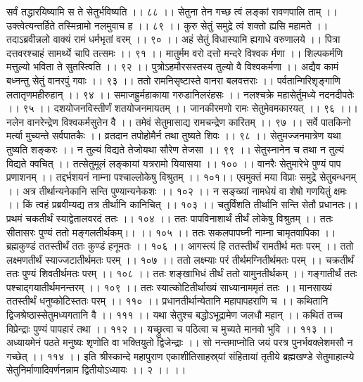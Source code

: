 सर्वं तद्धारयिष्यामि स ते सेतुर्भविष्यति ।। ८८ ।।
सेतुना तेन गच्छ त्वं लङ्कां रावणपालि ताम् ।।
उक्त्वेत्यन्तर्हिते तस्मिन्रामो नलमुवाच ह ।। ८९ ।।
कुरु सेतुं समुद्रे त्वं शक्तो ह्यसि महामते ।।
तदाऽब्रवीन्नलो वाक्यं रामं धर्मभृतां वरम् ।। ९० ।।
अहं सेतुं विधास्यामि ह्यगाधे वरुणालये ।।
पित्रा दत्तवरश्चाहं सामर्थ्ये चापि तत्समः ।। ९१ ।।
मातुर्मम वरो दत्तो मन्दरे विश्वक र्मणा ।।
शिल्पकर्मणि मत्तुल्यो भविता ते सुतस्त्विति ।। ९२ ।।
पुत्रोऽहमौरसस्तस्य तुल्यो वै विश्वकर्मणा ।।
अद्यैव कामं बध्नन्तु सेतुं वानरपुं गवाः ।। ९३ ।।
ततो रामनिसृष्टास्ते वानरा बलवत्तराः ।।
पर्वतान्गिरिशृङ्गाणि लतातृणमहीरुहान् ।। ९४ ।।
समाजह्रुर्महाकाया गरुडानिलरंहसः ।।
नलश्चक्रे महासेर्तुमध्ये नदनदीपतेः ।। ९५ ।।
दशयोजनविस्तीर्णं शतयोजनमायतम् ।।
जानकीरमणो रामः सेतुमेवमकारयत् ।। ९६ ।।।
नलेन वानरेन्द्रेण विश्वकर्मसुतेन वै ।।
तमेवं सेतुमासाद्य रामचन्द्रेण कारितम् ।। ९७ ।।
सर्वे पातकिनो मर्त्या मुच्यन्ते सर्वपातकैः ।।
व्रतदान तपोहोमैर्न तथा तुष्यते शिवः ।। ९८ ।।
सेतुमज्जनमात्रेण यथा तुष्यति शङ्करः ।।
न तुल्यं विद्यते तेजोयथा सौरेण तेजसा ।। ९९ ।।
सेतुस्नानेन च तथा न तुल्यं विद्यते क्वचित् ।।
तत्सेतुमूलं लङ्कायां यत्ररामो यियासया ।। १०० ।।
वानरैः सेतुमारेभे पुण्यं पाप प्रणाशनम् ।।
तद्दर्भशयनं नाम्ना पश्चाल्लोकेषु विश्रुतम् ।। १०१।।
एवमुक्तं मया विप्राः समुद्रे सेतुबन्धनम् ।।
अत्र तीर्थान्यनेकानि सन्ति पुण्यान्यनेकशः ।। १०२ ।।
न सङ्ख्यां नामधेयं वा शेषो गणयितुं क्षमः ।।
किं त्वहं प्रब्रवीम्यद्य तत्र तीर्थानि कानिचित् ।। १०३ ।।
चतुर्विंशति तीर्थानि सन्ति सेतौ प्रधानतः।।
प्रथमं चकतीर्थं स्याद्वेतालवरदं ततः ।। १०४ ।।
ततः पापविनाशार्थं तीर्थं लोकेषु विश्रुतम् ।।
ततः सीतासरः पुण्यं ततो मङ्गलतीर्थकम्।। ।। १०५ ।।
ततः सकलपापघ्नी नाम्ना चामृतवापिका ।।
ब्रह्मकुण्डं ततस्तीर्थं ततः कुण्डं हनूमतः ।। १०६ ।।
आगस्त्यं हि ततस्तीर्थं रामतीर्थ मतः परम् ।।
ततो लक्ष्मणतीर्थं स्याज्जटातीर्थमतः परम् ।। १०७ ।।
ततो लक्ष्म्याः परं तीर्थमग्नितीर्थमतः परम् ।।
चक्रतीर्थं ततः पुण्यं शिवतीर्थमतः परम् ।। १०८ ।।
ततः शङ्खाभिधं तीर्थं ततो यामुनतीर्थकम् ।।
गङ्गातीर्थं ततः पश्चाद्गयातीर्थमनन्तरम् ।। १०९ ।।
ततः स्यात्कोटितीर्थाख्यं साध्यानाममृतं ततः ।।
मानसाख्यं ततस्तीर्थं धनुष्कोटिस्ततः परम् ।। ११० ।।
प्रधानतीर्थान्येतानि महापापहराणि च ।।
कथितानि द्विजश्रेष्ठास्सेतुमध्यगतानि वै ।। १११ ।।
यथा सेतुश्च बद्धोऽभूद्रामेण जलधौ महान् ।।
कथितं तच्च विप्रेन्द्राः पुण्यं पापहारं तथा ।। ११२ ।।
यच्छ्रुत्वा च पठित्वा च मुच्यते मानवो भुवि ।। ११३ ।।
अध्यायमेनं पठते मनुष्यः शृणोति वा भक्तियुतो द्विजेन्द्राः ।।
सो नन्तमाप्नोति जयं परत्र पुनर्भवक्लेशमसौ न गच्छेत् ।। ११४ ।।
इति श्रीस्कान्दे महापुराण एकाशीतिसाहस्र्यां संहितायां तृतीये ब्रह्मखण्डे सेतुमाहात्म्ये सेतुनिर्माणादिवर्णनन्नाम द्वितीयोऽध्यायः ।। २ ।। ।।


